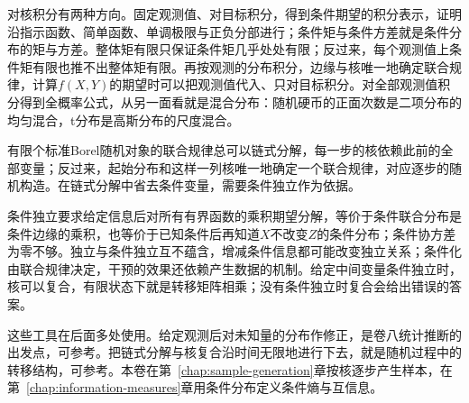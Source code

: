 对核积分有两种方向。固定观测值、对目标积分，得到条件期望的积分表示，证明沿指示函数、简单函数、单调极限与正负分部进行；条件矩与条件方差就是条件分布的矩与方差。整体矩有限只保证条件矩几乎处处有限；反过来，每个观测值上条件矩有限也推不出整体矩有限。再按观测的分布积分，边缘与核唯一地确定联合规律，计算$f(X,Y)$的期望时可以把观测值代入、只对目标积分。对全部观测值积分得到全概率公式，从另一面看就是混合分布：随机硬币的正面次数是二项分布的均匀混合，t分布是高斯分布的尺度混合。

有限个标准Borel随机对象的联合规律总可以链式分解，每一步的核依赖此前的全部变量；反过来，起始分布和这样一列核唯一地确定一个联合规律，对应逐步的随机构造。在链式分解中省去条件变量，需要条件独立作为依据。

条件独立要求给定信息后对所有有界函数的乘积期望分解，等价于条件联合分布是条件边缘的乘积，也等价于已知条件后再知道$X$不改变$Z$的条件分布；条件协方差为零不够。独立与条件独立互不蕴含，增减条件信息都可能改变独立关系；条件化由联合规律决定，干预的效果还依赖产生数据的机制。给定中间变量条件独立时，核可以复合，有限状态下就是转移矩阵相乘；没有条件独立时复合会给出错误的答案。

这些工具在后面多处使用。给定观测后对未知量的分布作修正，是卷八统计推断的出发点，可参考。把链式分解与核复合沿时间无限地进行下去，就是随机过程中的转移结构，可参考。本卷在第~\ref{chap:sample-generation}章按核逐步产生样本，在第~\ref{chap:information-measures}章用条件分布定义条件熵与互信息。
